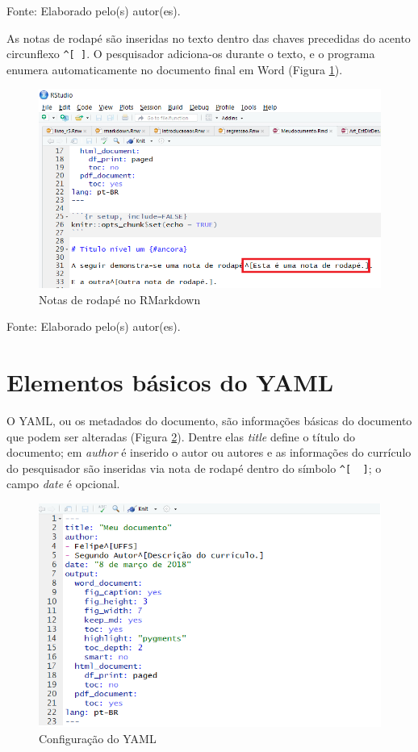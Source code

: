 \documentclass[12pt,brazil,]{book}
\begin{document}
Fonte: Elaborado pelo(s) autor(es).

As notas de rodapé são inseridas no texto dentro das chaves precedidas
do acento circunflexo \texttt{\^{}{[}\ {]}}. O pesquisador adiciona-os
durante o texto, e o programa enumera automaticamente no documento final
em Word (Figura \ref{fig:rmarkrodape}).

\begin{figure}

{\centering \includegraphics[width=0.6\linewidth]{rmarkrodape} 

}

\caption{Notas de rodapé no RMarkdown}\label{fig:rmarkrodape}
\end{figure}

Fonte: Elaborado pelo(s) autor(es).

\hypertarget{elementos-basicos-do-yaml}{%
\section{Elementos básicos do YAML}\label{elementos-basicos-do-yaml}}

O YAML, ou os metadados do documento, são informações básicas do
documento que podem ser alteradas (Figura \ref{fig:rmarkautor}). Dentre
elas \emph{title} define o título do documento; em \emph{author} é
inserido o autor ou autores e as informações do currículo do pesquisador
são inseridas via nota de rodapé dentro do símbolo
\texttt{\^{}{[}\ \ {]}}; o campo \emph{date} é opcional.

\begin{figure}

{\centering \includegraphics[width=0.6\linewidth]{rmarkautor} 

}

\caption{Configuração do YAML}\label{fig:rmarkautor}
\end{figure}
\end{document}
